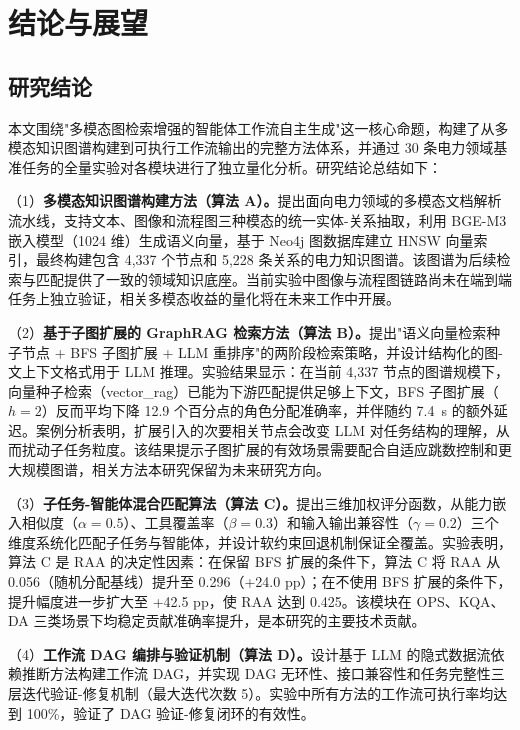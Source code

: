 \section{结论与展望}

\subsection{研究结论}

本文围绕"多模态图检索增强的智能体工作流自主生成"这一核心命题，构建了从多模态知识图谱构建到可执行工作流输出的完整方法体系，并通过 30 条电力领域基准任务的全量实验对各模块进行了独立量化分析。研究结论总结如下：

（1）\textbf{多模态知识图谱构建方法（算法 A）。}提出面向电力领域的多模态文档解析流水线，支持文本、图像和流程图三种模态的统一实体-关系抽取，利用 BGE-M3 嵌入模型（1024 维）生成语义向量，基于 Neo4j 图数据库建立 HNSW 向量索引，最终构建包含 4{,}337 个节点和 5{,}228 条关系的电力知识图谱。该图谱为后续检索与匹配提供了一致的领域知识底座。当前实验中图像与流程图链路尚未在端到端任务上独立验证，相关多模态收益的量化将在未来工作中开展。

（2）\textbf{基于子图扩展的 GraphRAG 检索方法（算法 B）。}提出"语义向量检索种子节点 + BFS 子图扩展 + LLM 重排序"的两阶段检索策略，并设计结构化的图-文上下文格式用于 LLM 推理。实验结果显示：在当前 4{,}337 节点的图谱规模下，向量种子检索（vector\_rag）已能为下游匹配提供足够上下文，BFS 子图扩展（$h=2$）反而平均下降 12.9 个百分点的角色分配准确率，并伴随约 7.4~s 的额外延迟。案例分析表明，扩展引入的次要相关节点会改变 LLM 对任务结构的理解，从而扰动子任务粒度。该结果提示子图扩展的有效场景需要配合自适应跳数控制和更大规模图谱，相关方法本研究保留为未来研究方向。

（3）\textbf{子任务-智能体混合匹配算法（算法 C）。}提出三维加权评分函数，从能力嵌入相似度（$\alpha=0.5$）、工具覆盖率（$\beta=0.3$）和输入输出兼容性（$\gamma=0.2$）三个维度系统化匹配子任务与智能体，并设计软约束回退机制保证全覆盖。实验表明，算法 C 是 RAA 的决定性因素：在保留 BFS 扩展的条件下，算法 C 将 RAA 从 0.056（随机分配基线）提升至 0.296（+24.0 pp）；在不使用 BFS 扩展的条件下，提升幅度进一步扩大至 +42.5 pp，使 RAA 达到 0.425。该模块在 OPS、KQA、DA 三类场景下均稳定贡献准确率提升，是本研究的主要技术贡献。

（4）\textbf{工作流 DAG 编排与验证机制（算法 D）。}设计基于 LLM 的隐式数据流依赖推断方法构建工作流 DAG，并实现 DAG 无环性、接口兼容性和任务完整性三层迭代验证-修复机制（最大迭代次数 5）。实验中所有方法的工作流可执行率均达到 100\%，验证了 DAG 验证-修复闭环的有效性。

